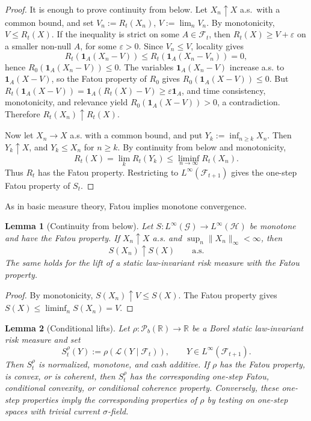 \documentclass[a4paper]{amsart}
\newtheorem{lemma}[lemma]{Lemma}
\theoremstyle{definition}
\newcommand{\R}{\mathbb{R}}
\newcommand{\F}{\mathcal{F}}
\newcommand{\G}{\mathcal{G}}
\newcommand{\cH}{\mathcal{H}}
\newcommand{\law}{\mathcal{L}}
\newcommand{\Pc}{\mathcal P}
\begin{document}
\begin{proof}
It is enough to prove continuity from below. Let \(X_n\uparrow X\) a.s.\ with a
common bound, and set \(V_n:=R_t(X_n)\), \(V:=\lim_n V_n\). By monotonicity,
\(V\le R_t(X)\). If the inequality is strict on some \(A\in\F_t\), then
\(R_t(X)\ge V+\varepsilon\) on a smaller non-null \(A\), for some
\(\varepsilon>0\). Since \(V_n\le V\), locality gives
\[
R_t(\mathbf 1_A(X_n-V))\le R_t(\mathbf 1_A(X_n-V_n))=0,
\]
hence \(R_0(\mathbf 1_A(X_n-V))\le0\). The variables
\(\mathbf 1_A(X_n-V)\) increase a.s. to \(\mathbf 1_A(X-V)\), so the Fatou
property of \(R_0\) gives \(R_0(\mathbf 1_A(X-V))\le0\). But
\(R_t(\mathbf 1_A(X-V))=\mathbf 1_A(R_t(X)-V)\ge\varepsilon\mathbf 1_A\),
and time consistency, monotonicity, and relevance yield
\(R_0(\mathbf 1_A(X-V))>0\), a contradiction. Therefore
\(R_t(X_n)\uparrow R_t(X)\).

Now let \(X_n\to X\) a.s. with a common bound, and put
\(Y_k:=\inf_{n\ge k}X_n\). Then \(Y_k\uparrow X\), and
\(Y_k\le X_n\) for \(n\ge k\). By continuity from below and monotonicity,
\[
R_t(X)=\lim_k R_t(Y_k)
\le \liminf_{n\to\infty}R_t(X_n).
\]
Thus \(R_t\) has the Fatou property. Restricting to
\(L^\infty(\F_{t+1})\) gives the one-step Fatou property of \(S_t\).
\end{proof}















As in basic
measure theory, Fatou implies monotone convergence.

\begin{lemma}[Continuity from below]
\label{lem:main-continuity-from-below}
Let \(S:L^\infty(\G)\to L^\infty(\cH)\) be monotone and have the Fatou
property. If \(X_n\uparrow X\) a.s. and \(\sup_n\|X_n\|_\infty<\infty\), then
\[
S(X_n)\uparrow S(X)
\qquad\text{a.s.}
\]
The same holds for the lift of a static law-invariant risk measure with the
Fatou property.
\end{lemma}

\begin{proof}
By monotonicity, \(S(X_n)\uparrow V\le S(X)\). The Fatou property gives
\(S(X)\le\liminf_n S(X_n)=V\).
\end{proof}

\begin{lemma}[Conditional lifts]
\label{lem:main-conditional-lifts}
Let \(\rho:\Pc_b(\R)\to\R\) be a Borel static law-invariant risk measure and
set
\[
S_t^\rho(Y):=\rho(\law(Y\mid\F_t)),
\qquad Y\in L^\infty(\F_{t+1}).
\]
Then \(S_t^\rho\) is normalized, monotone, and cash additive. If \(\rho\) has
the Fatou property, is convex, or is coherent, then \(S_t^\rho\) has the
corresponding one-step Fatou, conditional convexity, or conditional coherence
property. Conversely, these one-step properties imply the corresponding
properties of \(\rho\) by testing on one-step spaces with trivial current
\(\sigma\)-field.
\end{lemma}
\end{document}
